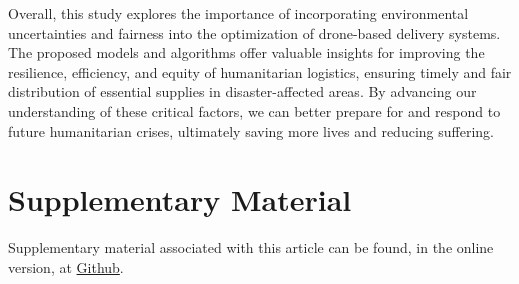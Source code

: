 \documentclass[preprint,review,11pt,authoryear]{elsarticle}
\begin{document}
Overall, this study explores the importance of incorporating environmental uncertainties and fairness into the optimization of drone-based delivery systems. The proposed models and algorithms offer valuable insights for improving the resilience, efficiency, and equity of humanitarian logistics, ensuring timely and fair distribution of essential supplies in disaster-affected areas. By advancing our understanding of these critical factors, we can better prepare for and respond to future humanitarian crises, ultimately saving more lives and reducing suffering.


\section*{Supplementary Material}\label{sec:supplementary}
Supplementary material associated with this article can be found, in the online version, at \href{https://github.com/jyuyangma/Qualifying_Exam}{Github}.




\newpage
\appendix
\end{document}
